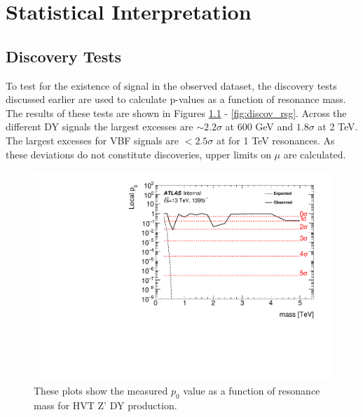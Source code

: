 \chapter{Statistical Interpretation}
\section{Discovery Tests}
To test for the existence of signal in the observed dataset, the discovery tests discussed earlier are used to calculate p-values as a function of resonance mass. The results of these tests are shown in Figures \ref{fig:discov_hvtww} - \ref{fig:discov_rsg}. Across the different DY signals the largest excesses are $\sim 2.2\sigma$ at 600 GeV and $1.8\sigma$ at 2 TeV. The largest excesses for VBF signals are $< 2.5\sigma$ at for 1 TeV resonances. As these deviations do not constitute discoveries, upper limits on $\mu$ are calculated.
 \begin{figure}[h!]
  \centering
  \includegraphics[width=\hsize]{figures/results/pvalues/hvtww_pvalue.pdf}
 \caption{These plots show the measured $p_{0}$ value as a function of resonance mass for HVT Z' DY production.} 
  \label{fig:discov_hvtww}
\end{figure} 
\FloatBarrier

